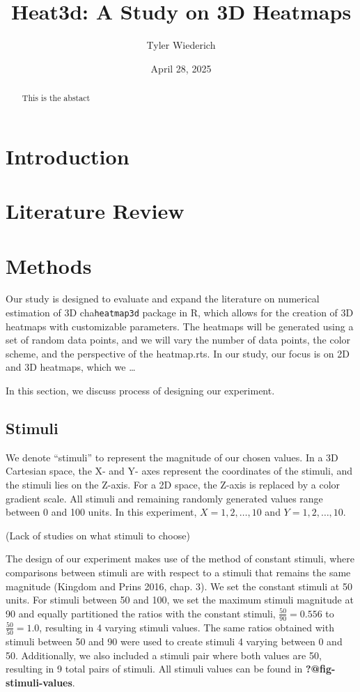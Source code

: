 \documentclass[
  letterpaper,
  DIV=11,
  numbers=noendperiod]{scrartcl}
\title{Heat3d: A Study on 3D Heatmaps}
\author{Tyler Wiederich}
\date{April 28, 2025}
\begin{document}
\maketitle
\begin{abstract}
This is the abstact
\end{abstract}


\section{Introduction}\label{introduction}

\section{Literature Review}\label{literature-review}

\section{Methods}\label{methods}

Our study is designed to evaluate and expand the literature on numerical
estimation of 3D cha\texttt{heatmap3d} package in R, which allows for
the creation of 3D heatmaps with customizable parameters. The heatmaps
will be generated using a set of random data points, and we will vary
the number of data points, the color scheme, and the perspective of the
heatmap.rts. In our study, our focus is on 2D and 3D heatmaps, which we
\ldots{}

In this section, we discuss process of designing our experiment.

\subsection{Stimuli}\label{stimuli}

We denote ``stimuli'' to represent the magnitude of our chosen values.
In a 3D Cartesian space, the X- and Y- axes represent the coordinates of
the stimuli, and the stimuli lies on the Z-axis. For a 2D space, the
Z-axis is replaced by a color gradient scale. All stimuli and remaining
randomly generated values range between 0 and 100 units. In this
experiment, \(X=1, 2, \dots,10\) and \(Y=1, 2,\dots,10\).

(Lack of studies on what stimuli to choose)

The design of our experiment makes use of the method of constant
stimuli, where comparisons between stimuli are with respect to a stimuli
that remains the same magnitude (Kingdom and Prins 2016, chap. 3). We
set the constant stimuli at 50 units. For stimuli between 50 and 100, we
set the maximum stimuli magnitude at 90 and equally partitioned the
ratios with the constant stimuli, \(\frac{50}{90}=0.556\) to
\(\frac{50}{50}=1.0\), resulting in 4 varying stimuli values. The same
ratios obtained with stimuli between 50 and 90 were used to create
stimuli 4 varying between 0 and 50. Additionally, we also included a
stimuli pair where both values are 50, resulting in 9 total pairs of
stimuli. All stimuli values can be found in
\textbf{?@fig-stimuli-values}.
\end{document}
